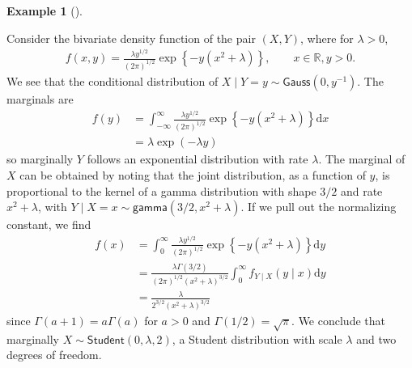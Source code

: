 \documentclass[
  11pt,
  letterpaper,
]{scrbook}
\theoremstyle{definition}
\theoremstyle{definition}
\newtheorem{example}{Example}[chapter]
\theoremstyle{definition}
\theoremstyle{plain}
\theoremstyle{plain}
\theoremstyle{remark}
\begin{document}
\begin{example}[]\protect\hypertarget{exm-conditional-marginal}{}\label{exm-conditional-marginal}

Consider the bivariate density function of the pair \((X, Y)\), where
for \(\lambda>0\), \begin{align*}
f(x,y) = \frac{\lambda y^{1/2}}{(2\pi)^{1/2}}\exp\left\{ - y(x^2 + \lambda)\right\}, \qquad x \in \mathbb{R}, y>0.
\end{align*} We see that the conditional distribution of
\(X \mid Y=y \sim \mathsf{Gauss}(0, y^{-1})\). The marginals are
\begin{align*}
f(y) &= \int_{-\infty}^\infty \frac{\lambda y^{1/2}}{(2\pi)^{1/2}}\exp\left\{ - y(x^2 + \lambda)\right\} \mathrm{d} x
\\&= \lambda \exp(-\lambda y)
\end{align*} so marginally \(Y\) follows an exponential distribution
with rate \(\lambda\). The marginal of \(X\) can be obtained by noting
that the joint distribution, as a function of \(y\), is proportional to
the kernel of a gamma distribution with shape \(3/2\) and rate
\(x^2+\lambda\), with
\(Y \mid X=x \sim \mathsf{gamma}(3/2, x^2+\lambda)\). If we pull out the
normalizing constant, we find \begin{align*}
f(x) &= \int_{0}^{\infty} \frac{\lambda y^{1/2}}{(2\pi)^{1/2}}\exp\left\{ - y(x^2 + \lambda)\right\} \mathrm{d} y\\&=
\frac{\lambda \Gamma(3/2)}{(2\pi)^{1/2}(x^2+\lambda)^{3/2}} \int_0^\infty f_{Y \mid X}(y \mid x) \mathrm{d} y \\ &= \frac{\lambda}{2^{3/2}(x^2+\lambda)^{3/2}}
\end{align*} since \(\Gamma(a+1) = a\Gamma(a)\) for \(a>0\) and
\(\Gamma(1/2) = \sqrt{\pi}\). We conclude that marginally
\(X \sim \mathsf{Student}(0, \lambda, 2)\), a Student distribution with
scale \(\lambda\) and two degrees of freedom.

\end{example}
\end{document}
